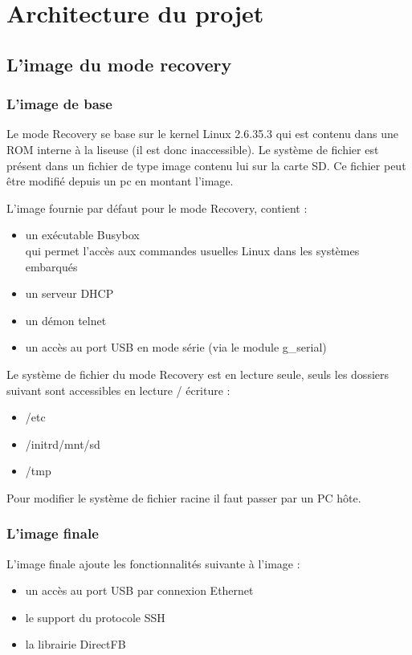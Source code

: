 \chapter{Architecture du projet}

\section{L'image du mode recovery}

\subsection{L'image de base}
Le mode Recovery se base sur le kernel Linux 2.6.35.3 qui est contenu dans une ROM interne à la liseuse (il est donc inaccessible). Le système de fichier est présent dans un fichier de type image contenu lui sur la carte SD. Ce fichier peut être modifié depuis un pc en montant l'image.

L'image fournie par défaut pour le mode Recovery, contient : 
\begin{itemize}
	\item un exécutable Busybox \\
		qui permet l'accès aux commandes usuelles Linux dans les systèmes embarqués
	\item un serveur DHCP
	\item un démon telnet
	\item un accès au port USB en mode série (via le module g_serial)
\end{itemize}


Le système de fichier du mode Recovery est en lecture seule, seuls les dossiers suivant sont accessibles en lecture / écriture : 
\begin{itemize}
	\item /etc
	\item /initrd/mnt/sd
	\item /tmp
\end{itemize}

Pour modifier le système de fichier racine il faut passer par un PC hôte.

\subsection{L'image finale}

L'image finale ajoute les fonctionnalités suivante à l'image : 
	\begin{itemize}
		\item un accès au port USB par connexion Ethernet
		\item le support du protocole SSH
		\item la librairie DirectFB
	\end{itemize}

